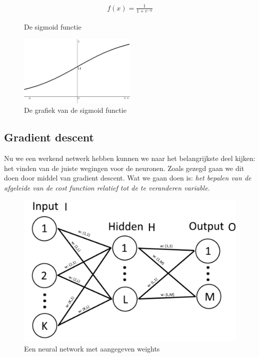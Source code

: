 \documentclass[a4paper,titlepage]{article}
\begin{document}
\begin{figure}[H]
	\begin{align*}
	   f(x) = \frac{1}{1 + e^{-u}}
	\end{align*}
	\caption{De sigmoid functie}
\end{figure}

\begin{figure}[H]
  \centering
    \includegraphics[width=0.5\textwidth]{sigmoid.png}
  \caption{De grafiek van de sigmoid functie}
  \label{fig:sigmoid-function}
\end{figure}


\subsection{Gradient descent}
Nu we een werkend netwerk hebben kunnen we naar het belangrijkste deel kijken: het vinden van de juiste wegingen voor de neuronen. Zoals gezegd gaan we dit doen door middel van gradient descent.
Wat we gaan doen is: \textit{het bepalen van de afgeleide van de cost function relatief tot de te veranderen variable.}

\begin{figure}[H]
  \centering
    \includegraphics[width=\textwidth]{NeuralNetworkWeights.png}
  \caption{Een neural network met aangegeven weights}
  \label{fig:NeuralNetworkWeights}
\end{figure}
\end{document}
